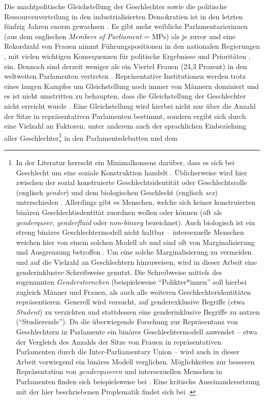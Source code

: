 \documentclass[12pt, 
    twoside=false, 
    bibliography=totoc, 
    numbers=endperiod, 
    headings=normal, 
    toc=chapterentrydotfill
    ]{scrbook}
\begin{document}
\noindent
Die machtpolitische Gleichstellung der Geschlechter sowie die politische Ressourcenverteilung in den industrialisierten Demokratien ist in den letzten fünfzig Jahren enorm gewachsen \parencite[318]{coffe_2010}. Es gibt mehr weibliche Parlamentarierinnen (aus dem englischen \emph{Members of Parliament} = MPs) als je zuvor und eine Rekordzahl von Frauen nimmt Führungspositionen in den nationalen Regierungen \parencites{lovenduski_2005}{paxton_2007}, mit vielen wichtigen Konsequenzen für politische Ergebnisse und Prioritäten \parencites{bolzendahl_2007}{carroll_2001}{waring_2000}[318]{coffe_2010}, ein. Dennoch sind derzeit weniger als ein Viertel Frauen (24,3 Prozent) in den weltweiten Parlamenten vertreten \parencite{ipu_2019}. Repräsentative Institutionen werden trotz eines langen Kampfes um Gleichstellung noch immer von Männern dominiert \parencites[149]{celis_2018}[497 f.]{childs_2013}{dahlerup_2013} {bjarnegard_2013} und es ist nicht umstritten zu behaupten, dass die Gleichstellung der Geschlechter nicht erreicht wurde \parencite[150]{celis_2018}. Eine Gleichstellung wird hierbei nicht nur über die Anzahl der Sitze in repräsentativen Parlamenten bestimmt, sondern ergibt sich durch eine Vielzahl an Faktoren, unter anderem auch der sprachlichen Einbeziehung aller Geschlechter\footnote{In der Literatur herrscht ein Minimalkonsens darüber, dass es sich bei Geschlecht um eine soziale Konstruktion handelt \parencite[2]{meissner_2008}. Üblicherweise wird hier zwischen der sozial konstruierte Geschlechtsidentität oder Geschlechtsrolle (englisch \emph{gender}) und dem biologischen Geschlecht (englisch \emph{sex}) unterschieden \parencite[3f.]{meissner_2008}. Allerdings gibt es Menschen, welche sich keiner konstruierten binären Geschlechtisdentität zuordnen wollen oder können (oft als \emph{genderqueer}, \emph{genderfluid} oder \emph{non-binary} bezeichnet). Auch biologisch ist ein streng binäres Geschlechtermodell nicht haltbar -- intersexuelle Menschen weichen hier von einem solchen Modell ab und sind oft von Marginalisierung und Ausgrenzung betroffen \parencite[vgl.][]{richards_2016}. Um eine solche Marginalisierung zu vermeiden und auf die Vielzahl an Geschlechtern hinzuweisen, wird in dieser Arbeit eine genderinklusive Schreibweise genutzt. Die Schreibweise mittels des sogenannten \emph{Gendersternchen} (beispielsweise \enquote{Polikter*innen} soll hierbei zugleich Männer und Frauen, als auch alle weiteren Geschlechteridentitäten repräsentieren. Generell wird versucht, auf genderexklusive Begriffe (etwa \emph{Student}) zu verzichten und stattdessen eine genderinklusive Begriffe zu nutzen (\enquote{Studierende}). Da die überwiegende Forschung zur Repräsentanz von Geschlechtern in Parlamente ein binäres Geschlechtermodell anwendet -- etwa der Vergleich des Anzahls der Sitze von Frauen in repräsentativen Parlamenten durch die Inter-Parliamentary Union \textcite{ipu_2019} -- wird auch in dieser Arbeit vorwiegend ein binäres Modell verglichen. Möglichkeiten zur besseren Repräsentation von \emph{genderqueeren} und intersexuellen Menschen in Parlamenten finden sich beispielsweise bei \textcite{squires_2008}. Eine kritische Auseinandersetzung mit der hier beschriebenen Proplematik findet sich bei \parencite[6ff.]{meissner_2008}.} in den Parlamentsdebatten und dem 
\end{document}
